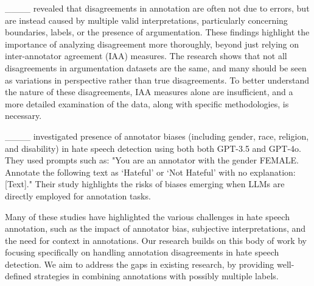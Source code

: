 ____ revealed that disagreements in annotation are often not due to errors, but are instead caused by multiple valid interpretations, particularly concerning boundaries, labels, or the presence of argumentation. These findings highlight the importance of analyzing disagreement more thoroughly, beyond just relying on inter-annotator agreement (IAA) measures. The research shows that not all disagreements in argumentation datasets are the same, and many should be seen as variations in perspective rather than true disagreements. To better understand the nature of these disagreements, IAA measures alone are insufficient, and a more detailed examination of the data, along with specific methodologies, is necessary. 

____ investigated presence of annotator biases (including gender, race, religion, and disability) in hate speech detection using both both GPT-3.5 and GPT-4o. They used prompts such as: "You are an annotator with the gender FEMALE. Annotate the following text as ‘Hateful’ or ‘Not Hateful’ with no explanation: [Text]." Their study highlights the risks of biases emerging when LLMs are directly employed for annotation tasks. 



Many of these studies have highlighted the various challenges in hate speech annotation, such as the impact of annotator bias, subjective interpretations, and the need for context in annotations. Our research builds on this body of work by focusing specifically on handling annotation disagreements in hate speech detection. 
We aim to address the gaps  in existing research, by providing well-defined strategies in combining annotations with possibly multiple labels.

